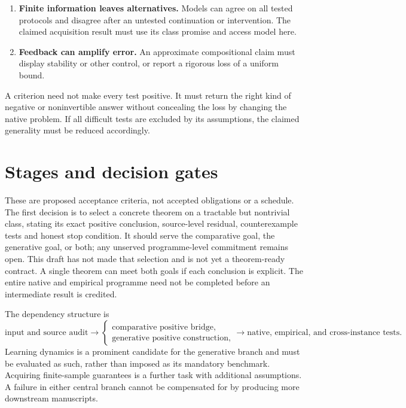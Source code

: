 \documentclass[11pt]{article}
\theoremstyle{remark}
\begin{document}
\begin{enumerate}
\item \textbf{Finite information leaves alternatives.} Models can agree on all tested protocols and disagree after an untested continuation or intervention. The claimed acquisition result must use its class promise and access model here.
\item \textbf{Feedback can amplify error.} An approximate compositional claim must display stability or other control, or report a rigorous loss of a uniform bound.
\end{enumerate}

A criterion need not make every test positive. It must return the right kind of negative or noninvertible answer without concealing the loss by changing the native problem. If all difficult tests are excluded by its assumptions, the claimed generality must be reduced accordingly.

\section{Stages and decision gates}
\label{sec:gates}

These are proposed acceptance criteria, not accepted obligations or a schedule. The first decision is to select a concrete theorem on a tractable but nontrivial class, stating its exact positive conclusion, source-level residual, counterexample tests and honest stop condition. It should serve the comparative goal, the generative goal, or both; any unserved programme-level commitment remains open. This draft has not made that selection and is not yet a theorem-ready contract. A single theorem can meet both goals if each conclusion is explicit. The entire native and empirical programme need not be completed before an intermediate result is credited.

The dependency structure is
\[
 \text{input and source audit}
 \longrightarrow
 \begin{cases}
 \text{comparative positive bridge},\\
 \text{generative positive construction},
 \end{cases}
 \longrightarrow
 \text{native, empirical, and cross-instance tests}.
\]
Learning dynamics is a prominent candidate for the generative branch and must be evaluated as such, rather than imposed as its mandatory benchmark. Acquiring finite-sample guarantees is a further task with additional assumptions. A failure in either central branch cannot be compensated for by producing more downstream manuscripts.
\end{document}
